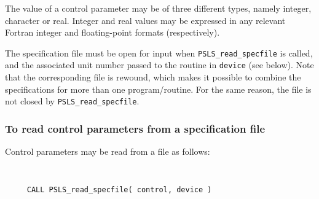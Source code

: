 \documentclass{galahad}
\newcommand{\packagename}{PSLS}
\begin{document}
The value of a control parameter may be of three different types, namely
integer, character or real.
Integer and real values may be expressed in any relevant Fortran integer and
floating-point formats (respectively).

The specification file must be open for
input when {\tt \packagename\_read\_specfile}
is called, and the associated unit number
passed to the routine in {\tt device} (see below).
Note that the corresponding
file is rewound, which makes it possible to combine the specifications
for more than one program/routine.  For the same reason, the file is not
closed by {\tt \packagename\_read\_specfile}.

\subsubsection{To read control parameters from a specification file}
\label{readspec}

Control parameters may be read from a file as follows:
\hskip0.5in

\def\baselinestretch{0.8}
{\tt
\begin{verbatim}
     CALL PSLS_read_specfile( control, device )
\end{verbatim}
}
\def\baselinestretch{1.0}
\end{document}
